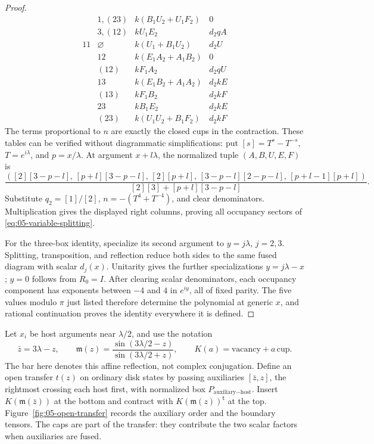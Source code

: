 \begin{proof}
\[\begin{array}{c|c|c|c}
&1,(23)&k(B_1U_2+U_1F_2)&0\\
&3,(12)&kU_1E_2&d_2qA\\\hline
11&\varnothing&k(U_1+B_1U_2)&d_2U\\
&12&k(E_1A_2+A_1B_2)&0\\
&(12)&kF_1A_2&d_2qU\\
&13&k(E_1B_2+A_1A_2)&d_2kE\\
&(13)&kF_1B_2&d_2kF\\
&23&kB_1E_2&d_2kE\\
&(23)&k(U_1U_2+B_1F_2)&d_2kF
\end{array}
\]
The terms proportional to \(n\) are exactly the closed cups in the contraction. These tables can be verified without diagrammatic simplifications: put \([s]=T^s-T^{-s}\), \(T=e^{i\lambda}\), and \(p=x/\lambda\). At argument \(x+l\lambda\), the normalized tuple \((A,B,U,E,F)\) is
\[
 \frac{([2][3-p-l],\,[p+l][3-p-l],\,[2][p+l],\,
         [3-p-l][2-p-l],\,[p+l-1][p+l])}
      {[2][3]+[p+l][3-p-l]}.
\]
Substitute \(q_2=[1]/[2]\), \(n=-(T^4+T^{-4})\), and clear denominators. Multiplication gives the displayed right columns, proving all occupancy sectors of \eqref{eq:05-variable-splitting}.

For the three-box identity, specialize its second argument to \(y=j\lambda\), \(j=2,3\). Splitting, transposition, and reflection reduce both sides to the same fused diagram with scalar \(d_j(x)\). Unitarity gives the further specializations \(y=j\lambda-x\); \(y=0\) follows from \(R_0=I\). After clearing scalar denominators, each occupancy component has exponents between \(-4\) and \(4\) in \(e^{iy}\), all of fixed parity. The five values modulo \(\pi\) just listed therefore determine the polynomial at generic \(x\), and rational continuation proves the identity everywhere it is defined.
\end{proof}

Let \(x_i\) be host arguments near \(\lambda/2\), and use the notation
\[
 \bar z=3\lambda-z,
 \qquad \mathfrak m(z)=\frac{\sin(3\lambda/2-z)}{\sin(3\lambda/2+z)},
 \qquad K(a)=\text{vacancy}+a\,\text{cup}.
\]
The bar here denotes this affine reflection, not complex conjugation. Define an open transfer \(t(z)\) on ordinary disk states by passing auxiliaries \([\bar z,z]\), the rightmost crossing each host first, with normalized box \(P_{\text{auxiliary}-\text{host}}\). Insert \(K(\mathfrak m(\bar z))\) at the bottom and contract with \(K(\mathfrak m(z))^{\mathsf t}\) at the top.
Figure~\ref{fig:05-open-transfer} records the auxiliary order and the
boundary tensors. The caps are part of the transfer: they contribute
the two scalar factors when auxiliaries are fused.

